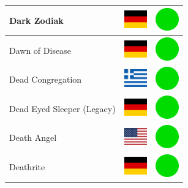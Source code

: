 \documentclass[12pt, a4paper, twoside]{report}
\begin{document}
\begin{center}
\begin{longtable}{|p{5cm}|p{2cm}|p{2cm}|}
			Dark Zodiak & \includegraphics[width=1cm]{4x3/de} & \includegraphics[width=1cm]{likes/y} \\ \hline
			Dawn of Disease & \includegraphics[width=1cm]{4x3/de} & \includegraphics[width=1cm]{likes/y} \\ \hline
			Dead Congregation & \includegraphics[width=1cm]{4x3/gr} & \includegraphics[width=1cm]{likes/y} \\ \hline
			Dead Eyed Sleeper (Legacy) & \includegraphics[width=1cm]{4x3/de} & \includegraphics[width=1cm]{likes/y} \\ \hline
			Death Angel & \includegraphics[width=1cm]{4x3/us} & \includegraphics[width=1cm]{likes/y} \\ \hline
			Deathrite & \includegraphics[width=1cm]{4x3/de} & \includegraphics[width=1cm]{likes/y} \\ \hline

\end{longtable}
\end{center}
\end{document}
